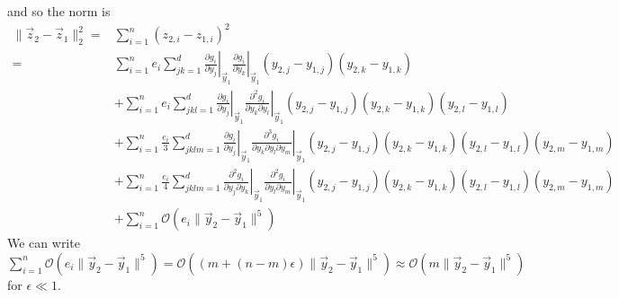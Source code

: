 \documentclass[12pt]{article}
\begin{document}
%
and so the norm is
%
\begin{equation} \label{eq:appendix_z_norm}
\begin{aligned}
\|\vec{z}_2 - \vec{z}_1\|_2^2 =& 
\sum_{i=1}^n (z_{2,i} - z_{1,i})^2 \\
=& \sum_{i=1}^n e_i \sum_{jk=1}^d \left. \frac{\partial g_i}{\partial y_j} \right|_{\vec{y}_1} \left. \frac{\partial g_i}{\partial y_k} \right|_{\vec{y}_1} (y_{2,j}-y_{1,j}) (y_{2,k}-y_{1,k}) \\
&+ \sum_{i=1}^n e_i \sum_{jkl=1}^d \left. \frac{\partial g_i}{\partial y_j} \right|_{\vec{y}_1} \left. \frac{\partial^2 g_i}{\partial y_k \partial y_l} \right|_{\vec{y}_1} (y_{2,j}-y_{1,j})  (y_{2,k}-y_{1,k}) (y_{2,l}-y_{1,l}) \\
&+ \sum_{i=1}^n \frac{e_i}{3} \sum_{jklm=1}^d \left. \frac{\partial g_i}{\partial y_j} \right|_{\vec{y}_1} \left. \frac{\partial^3 g_i}{ \partial y_k \partial y_l \partial y_m} \right|_{\vec{y}_1} (y_{2,j}-y_{1,j}) (y_{2,k}-y_{1,k}) (y_{2,l}-y_{1,l})(y_{2,m}-y_{1,m}) \\
&+ \sum_{i=1}^n \frac{e_i}{4} \sum_{jklm=1}^d \left. \frac{\partial^2 g_i}{\partial y_j \partial y_k} \right|_{\vec{y}_1} \left. \frac{\partial^2 g_i}{\partial y_l \partial y_m} \right|_{\vec{y}_1} (y_{2,j}-y_{1,j}) (y_{2,k}-y_{1,k}) (y_{2,l}-y_{1,l}) (y_{2,m}-y_{1,m}) \\
&+ \sum_{i=1}^n \mathcal{O}( e_i \|\vec{y}_2 - \vec{y}_1 \|^5)
\end{aligned}
\end{equation}
%
We can write $\sum_{i=1}^n \mathcal{O}( e_i \|\vec{y}_2 - \vec{y}_1 \|^5) = \mathcal{O}( (m + (n-m) \epsilon) \|\vec{y}_2 - \vec{y}_1 \|^5) \approx \mathcal{O}( m \|\vec{y}_2 - \vec{y}_1 \|^5)$ for $\epsilon \ll 1$. 
\end{document}
